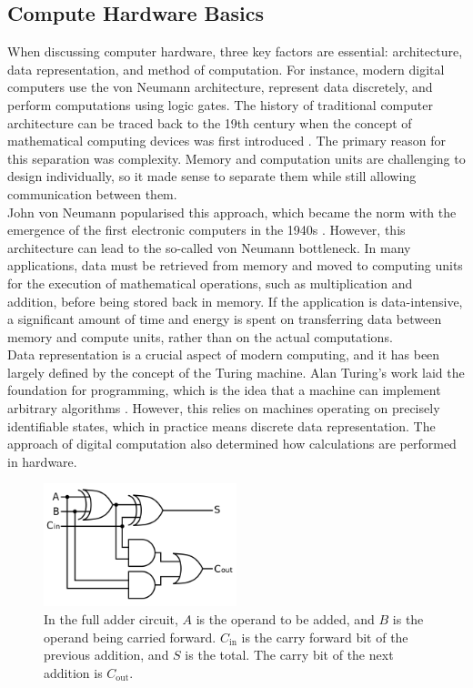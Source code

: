 \subsection[Compute Hardware Basics]{Compute Hardware Basics}

\noindent When discussing computer hardware, three key factors are essential: architecture, data representation, and method of computation. For instance, modern digital computers use the von Neumann architecture, represent data discretely, and perform computations using logic gates. The history of traditional computer architecture can be traced back to the 19th century when the concept of mathematical computing devices was first introduced \cite{bromley1982charles}. The primary reason for this separation was complexity. Memory and computation units are challenging to design individually, so it made sense to separate them while still allowing communication between them. \\

\noindent John von Neumann popularised this approach, which became the norm with the emergence of the first electronic computers in the 1940s \cite{von1993first}. However, this architecture can lead to the so-called von Neumann bottleneck. In many applications, data must be retrieved from memory and moved to computing units for the execution of mathematical operations, such as multiplication and addition, before being stored back in memory. If the application is data-intensive, a significant amount of time and energy is spent on transferring data between memory and compute units, rather than on the actual computations. \\

\noindent Data representation is a crucial aspect of modern computing, and it has been largely defined by the concept of the Turing machine. Alan Turing's work laid the foundation for programming, which is the idea that a machine can implement arbitrary algorithms \cite{turing1936computable}. However, this relies on machines operating on precisely identifiable states, which in practice means discrete data representation. The approach of digital computation also determined how calculations are performed in hardware. \\

\begin{figure}[htbp!] 
\centering    
\includegraphics[width=0.5\textwidth]{Chapter1/Figs/1f.png}
\caption[Full Adder Circuit.]{In the full adder circuit, $A$ is the operand to be added, and $B$ is the operand being carried forward. $C_\mathrm{in}$ is the carry forward bit of the previous addition, and $S$ is the total. The carry bit of the next addition is $C_\mathrm{out}$.}
\label{fig:1f}
\end{figure}

